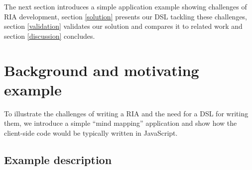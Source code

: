 \documentclass[american,english,runningheads]{llncs}
\begin{document}
% 
% 
% 
% 
% 
% 

The next section introduces a simple application example showing challenges of RIA development, section
\ref{solution} presents our DSL tackling these challenges, section \ref{validation} validates our solution and
compares it to related work and section \ref{discussion} concludes.


\section{Background and motivating example}
\label{problem}

To illustrate the challenges of writing a RIA and the need for a DSL for writing them, we introduce a simple “mind
mapping” application and show how the client-side code would be typically written in JavaScript.

\subsection{Example description}
\end{document}
